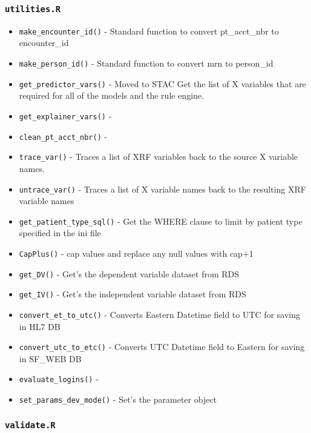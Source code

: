 \documentclass[
]{book}
\providecommand{\tightlist}{%
  \setlength{\itemsep}{0pt}\setlength{\parskip}{0pt}}
\begin{document}
\hypertarget{utilities.r-1}{%
\subsubsection{\texorpdfstring{\texttt{utilities.R}}{utilities.R}}\label{utilities.r-1}}

\begin{itemize}
\tightlist
\item
  \texttt{make\_encounter\_id()} - Standard function to convert pt\_acct\_nbr to encounter\_id
\item
  \texttt{make\_person\_id()} - Standard function to convert mrn to person\_id
\item
  \texttt{get\_predictor\_vars()} - Moved to STAC Get the list of X variables that are required for all of the models and the rule engine.
\item
  \texttt{get\_explainer\_vars()} -
\item
  \texttt{clean\_pt\_acct\_nbr()} -
\item
  \texttt{trace\_var()} - Traces a list of XRF variables back to the source X variable names.
\item
  \texttt{untrace\_var()} - Traces a list of X variable names back to the resulting XRF variable names
\item
  \texttt{get\_patient\_type\_sql()} - Get the WHERE clause to limit by patient type specified in the ini file
\item
  \texttt{CapPlus()} - cap values and replace any null values with cap+1
\item
  \texttt{get\_DV()} - Get's the dependent variable dataset from RDS
\item
  \texttt{get\_IV()} - Get's the independent variable dataset from RDS
\item
  \texttt{convert\_et\_to\_utc()} - Converts Eastern Datetime field to UTC for saving in HL7 DB
\item
  \texttt{convert\_utc\_to\_etc()} - Converts UTC Datetime field to Eastern for saving in SF\_WEB DB
\item
  \texttt{evaluate\_logins()} -
\item
  \texttt{set\_params\_dev\_mode()} - Set's the parameter object
\end{itemize}

\hypertarget{validate.r}{%
\subsubsection{\texorpdfstring{\texttt{validate.R}}{validate.R}}\label{validate.r}}
\end{document}
